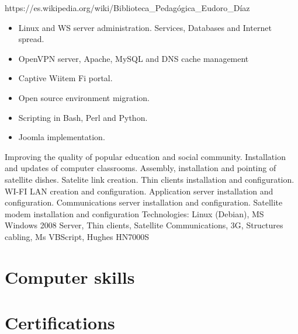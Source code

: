 \documentclass[11pt,a4paper,sans]{moderncv}        %
\begin{document}
  {
    https://es.wikipedia.org/wiki/Biblioteca\_Pedagógica\_Eudoro\_Díaz\\
    \begin{itemize}
      \item Linux and WS server administration. Services, Databases and Internet spread.
      \item OpenVPN server, Apache, MySQL and DNS cache management
      \item Captive Wiitem Fi portal.
      \item Open source environment migration.
      \item Scripting in Bash, Perl and Python.
      \item Joomla implementation.
    \end{itemize}
  }
  {
    Improving the quality of popular education and social community. Installation and updates of computer classrooms. Assembly, installation and pointing of satellite dishes. Satelite link creation. Thin clients installation and configuration. WI-FI LAN creation and configuration. Application server installation and configuration. Communications server installation and configuration. Satellite modem installation and configuration Technologies: Linux (Debian), MS Windows 2008 Server, Thin clients, Satellite Communications, 3G, Structures cabling, Ms VBScript, Hughes HN7000S
  }

\section{Computer skills}

\section{Certifications}
\end{document}
